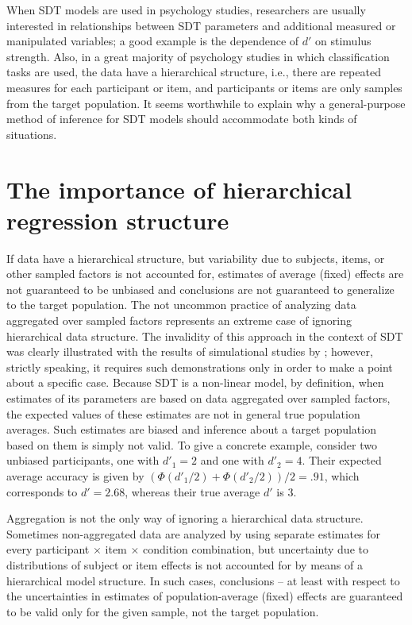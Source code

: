 \documentclass[a4paper,man,apacite,floatsintext]{apa6}
\begin{document}
When SDT models are used in psychology studies, researchers are
usually interested in relationships between SDT parameters and
additional measured or manipulated variables; a good example is the
dependence of $d'$ on stimulus strength. Also, in a great majority of
psychology studies in which classification tasks are used, the data
have a hierarchical structure, i.e., there are repeated measures for
each participant or item, and participants or items are only samples
from the target population. It seems worthwhile to explain why a
general-purpose method of inference for SDT models should accommodate
both kinds of situations.

\section{The importance of hierarchical regression structure}

If data have a hierarchical structure, but variability due to
subjects, items, or other sampled factors is not accounted for,
estimates of average (fixed) effects are not guaranteed to be unbiased
and conclusions are not guaranteed to generalize to the target
population. The not uncommon practice of analyzing data aggregated
over sampled factors represents an extreme case of ignoring
hierarchical data structure. The invalidity of this approach in the
context of SDT was clearly illustrated with the results of
simulational studies by ; however,
strictly speaking, it requires such demonstrations only in order to
make a point about a specific case. Because SDT is a non-linear model,
by definition, when estimates of its parameters are based on data
aggregated over sampled factors, the expected values of these
estimates are not in general true population averages. Such estimates
are biased and inference about a target population based on them is
simply not valid. To give a concrete example, consider two unbiased
participants, one with $d'_1 = 2$ and one with $d'_2 = 4$. Their
expected average accuracy is given by
$(\Phi(d'_1/2) + \Phi(d'_2/2)) / 2 = .91$, which corresponds to
$d' = 2.68$, whereas their true average $d'$ is $3$.

Aggregation is not the only way of ignoring a hierarchical data
structure. Sometimes non-aggregated data are analyzed by using
separate estimates for every participant $\times$ item $\times$
condition combination, but uncertainty due to distributions of subject
or item effects is not accounted for by means of a hierarchical model
structure. In such cases, conclusions -- at least with respect to the
uncertainties in estimates of population-average (fixed) effects are
guaranteed to be valid only for the given sample, not the target
population.
\end{document}
